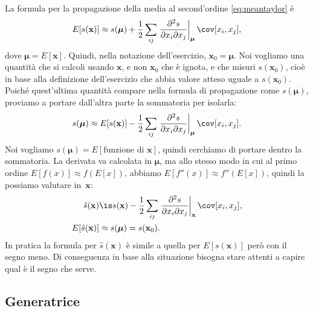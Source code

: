 \begin{solution}
    La formula per la propagazione della media al second'ordine
    \eqref{eq:meantaylor} è
    \begin{equation*}
        E[s(\mathbf x)] \approx s(\boldsymbol\mu) +
        \frac12 \sum_{ij}
        \left.\frac{\partial^2 s}{\partial x_i \partial x_j}
        \right|_{\boldsymbol\mu}
        \cov[x_i, x_j],
    \end{equation*}
    dove $\boldsymbol\mu = E[\mathbf x]$. Quindi, nella notazione
    dell'esercizio, $\mathbf x_0 = \boldsymbol\mu$. Noi vogliamo una quantità
    che si calcoli usando $\mathbf x$, e non $\mathbf x_0$ che è ignota,
    e che misuri $s(\mathbf x_0)$, cioè in base alla definizione dell'esercizio
    che abbia valore atteso uguale a $s(\mathbf x_0)$. Poiché quest'ultima
    quantità compare nella formula di propagazione come $s(\boldsymbol\mu)$,
    proviamo a portare dall'altra parte la sommatoria per isolarla:
    \begin{equation*}
        s(\boldsymbol\mu) \approx E[s(\mathbf x)] -
        \frac12 \sum_{ij}
        \left.\frac{\partial^2 s}{\partial x_i \partial x_j}
        \right|_{\boldsymbol\mu}
        \cov[x_i, x_j].
    \end{equation*}
    Noi vogliamo $s(\boldsymbol\mu) = E[\text{funzione di $\mathbf x$}]$,
    quindi cerchiamo di portare dentro la sommatoria. La derivata va calcolata
    in $\boldsymbol\mu$, ma allo stesso modo in cui al primo ordine $E[f(x)]
    \approx f(E[x])$, abbiamo $E[f''(x)] \approx f''(E[x])$, quindi la
    possiamo valutare in~$\mathbf x$:
    \begin{align*}
        \hat s(\mathbf x) &\is s(\mathbf x) -
        \frac12 \sum_{ij}
        \left.\frac{\partial^2 s}{\partial x_i \partial x_j}
        \right|_{\mathbf x}
        \cov[x_i, x_j], \\
        E[\hat s(\mathbf x)] &\approx s(\boldsymbol\mu) = s(\mathbf x_0).
    \end{align*}
    In pratica la formula per $\hat s(\mathbf x)$ è simile a quella per
    $E[s(\mathbf x)]$ però con il segno meno. Di conseguenza in base alla
    situazione bisogna stare attenti a capire qual è il segno che serve.
\end{solution}

\subsection{Generatrice}

